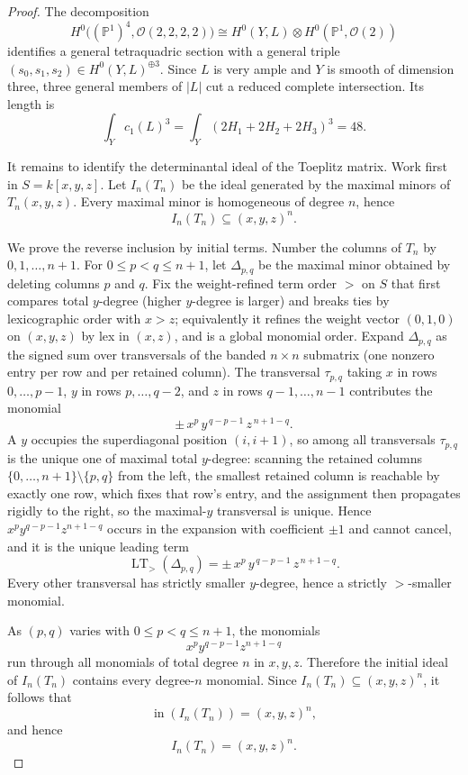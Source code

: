 \documentclass[11pt]{article}
\theoremstyle{plain}
\theoremstyle{definition}
\theoremstyle{remark}
\newcommand{\PP}{\mathbb{P}}
\newcommand{\cO}{\mathcal{O}}
\begin{document}
\begin{proof}
The decomposition
\[
H^0\big((\PP^1)^4,\cO(2,2,2,2)\big)
\cong
H^0(Y,L)\otimes H^0(\PP^1,\cO(2))
\]
identifies a general tetraquadric section with a general triple $(s_0,s_1,s_2)\in H^0(Y,L)^{\oplus3}$.  Since $L$ is very ample and $Y$ is smooth of dimension three, three general members of $|L|$ cut a reduced complete intersection.  Its length is
\[
\int_Y c_1(L)^3=\int_Y(2H_1+2H_2+2H_3)^3=48.
\]

It remains to identify the determinantal ideal of the Toeplitz matrix.  Work first in $S=k[x,y,z]$.  Let $I_n(T_n)$ be the ideal generated by the maximal minors of $T_n(x,y,z)$.  Every maximal minor is homogeneous of degree $n$, hence
\[
I_n(T_n)\subseteq (x,y,z)^n.
\]

We prove the reverse inclusion by initial terms.  Number the columns of $T_n$ by $0,1,\ldots,n+1$.  For $0\le p<q\le n+1$, let $\Delta_{p,q}$ be the maximal minor obtained by deleting columns $p$ and $q$.  Fix the weight-refined term order $>$ on $S$ that first compares total $y$-degree (higher $y$-degree is larger) and breaks ties by lexicographic order with $x>z$; equivalently it refines the weight vector $(0,1,0)$ on $(x,y,z)$ by lex in $(x,z)$, and is a global monomial order.  Expand $\Delta_{p,q}$ as the signed sum over transversals of the banded $n\times n$ submatrix (one nonzero entry per row and per retained column).  The transversal $\tau_{p,q}$ taking $x$ in rows $0,\dots,p-1$, $y$ in rows $p,\dots,q-2$, and $z$ in rows $q-1,\dots,n-1$ contributes the monomial
\[
\pm\,x^p\,y^{\,q-p-1}\,z^{\,n+1-q}.
\]
A $y$ occupies the superdiagonal position $(i,i+1)$, so among all transversals $\tau_{p,q}$ is the unique one of maximal total $y$-degree: scanning the retained columns $\{0,\dots,n+1\}\setminus\{p,q\}$ from the left, the smallest retained column is reachable by exactly one row, which fixes that row's entry, and the assignment then propagates rigidly to the right, so the maximal-$y$ transversal is unique.  Hence $x^p y^{q-p-1}z^{n+1-q}$ occurs in the expansion with coefficient $\pm1$ and cannot cancel, and it is the unique leading term
\[
\operatorname{LT}_{>}(\Delta_{p,q})=\pm\,x^p\,y^{\,q-p-1}\,z^{\,n+1-q}.
\]
Every other transversal has strictly smaller $y$-degree, hence a strictly $>$-smaller monomial.

As $(p,q)$ varies with $0\le p<q\le n+1$, the monomials
\[
x^p y^{q-p-1}z^{n+1-q}
\]
run through all monomials of total degree $n$ in $x,y,z$.  Therefore the initial ideal of $I_n(T_n)$ contains every degree-$n$ monomial.  Since $I_n(T_n)\subseteq (x,y,z)^n$, it follows that
\[
\operatorname{in}(I_n(T_n))=(x,y,z)^n,
\]
and hence
\[
I_n(T_n)=(x,y,z)^n.
\]


\end{proof}
\end{document}
